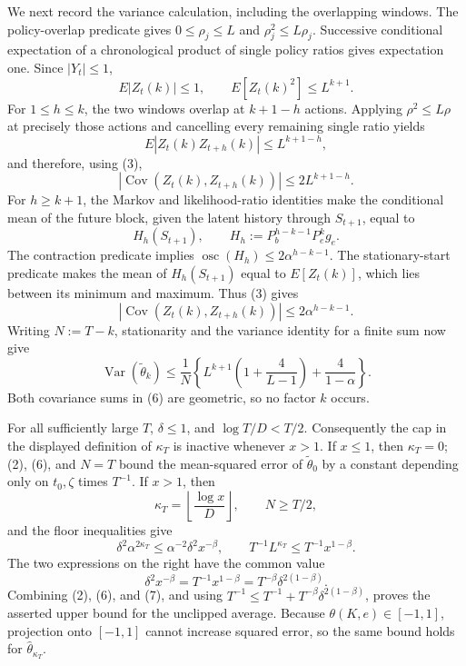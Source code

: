 We next record the variance calculation, including the overlapping windows.  The policy-overlap predicate gives \(0\le\rho_j\le L\) and \(\rho_j^2\le L\rho_j\).  Successive conditional expectation of a chronological product of single policy ratios gives expectation one.  Since \(|Y_t|\le1\),
\[
 E|Z_t(k)|\le1,
 \qquad
 E[Z_t(k)^2]\le L^{k+1}. \tag{3}
\]
For \(1\le h\le k\), the two windows overlap at \(k+1-h\) actions.  Applying \(\rho^2\le L\rho\) at precisely those actions and cancelling every remaining single ratio yields
\[
 E|Z_t(k)Z_{t+h}(k)|\le L^{k+1-h},
\]
and therefore, using (3),
\[
 |\operatorname{Cov}(Z_t(k),Z_{t+h}(k))|
 \le2L^{k+1-h}. \tag{4}
\]
For \(h\ge k+1\), the Markov and likelihood-ratio identities make the conditional mean of the future block, given the latent history through \(S_{t+1}\), equal to
\[
 H_h(S_{t+1}),
 \qquad H_h:=P_b^{h-k-1}P_e^kg_e.
\]
The contraction predicate implies
\(\operatorname{osc}(H_h)\le2\alpha^{h-k-1}\).  The stationary-start predicate makes the mean of \(H_h(S_{t+1})\) equal to \(E[Z_t(k)]\), which lies between its minimum and maximum.  Thus (3) gives
\[
 |\operatorname{Cov}(Z_t(k),Z_{t+h}(k))|
 \le2\alpha^{h-k-1}. \tag{5}
\]
Writing \(N:=T-k\), stationarity and the variance identity for a finite sum now give
\[
 \operatorname{Var}(\widetilde\theta_k)
 \le \frac1N\left\{
 L^{k+1}\left(1+\frac4{L-1}\right)
 +\frac4{1-\alpha}\right\}. \tag{6}
\]
Both covariance sums in (6) are geometric, so no factor \(k\) occurs.

For all sufficiently large \(T\), \(\delta\le1\), and
\(\log T/D<T/2\).  Consequently the cap in the displayed definition of \(\kappa_T\) is inactive whenever \(x>1\).  If \(x\le1\), then \(\kappa_T=0\); (2), (6), and \(N=T\) bound the mean-squared error of \(\widetilde\theta_0\) by a constant depending only on \(t_0,\zeta\) times \(T^{-1}\).  If \(x>1\), then
\[
 \kappa_T=\left\lfloor\frac{\log x}{D}\right\rfloor,
 \qquad N\ge T/2,
\]
and the floor inequalities give
\[
 \delta^2\alpha^{2\kappa_T}
 \le\alpha^{-2}\delta^2x^{-\beta},
 \qquad
 T^{-1}L^{\kappa_T}
 \le T^{-1}x^{1-\beta}.
\]
The two expressions on the right have the common value
\[
 \delta^2x^{-\beta}
 =T^{-1}x^{1-\beta}
 =T^{-\beta}\delta^{2(1-\beta)}. \tag{7}
\]
Combining (2), (6), and (7), and using \(T^{-1}\le T^{-1}+T^{-\beta}\delta^{2(1-\beta)}\), proves the asserted upper bound for the unclipped average.  Because \(\theta(K,e)\in[-1,1]\), projection onto \([-1,1]\) cannot increase squared error, so the same bound holds for \(\widehat\theta_{\kappa_T}\).


